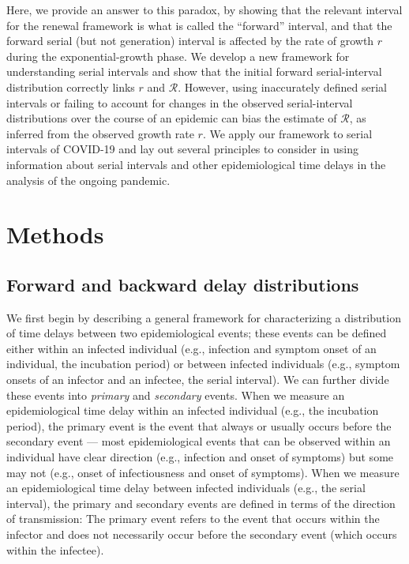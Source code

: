 \documentclass[12pt]{article}
\newcommand{\comment}{\showcomment}
\newcommand{\showcomment}[3]{\textcolor{#1}{\textbf{[#2: }\textsl{#3}\textbf{]}}}
\newcommand{\jd}[1]{\comment{cyan}{JD}{#1}}
\newcommand{\swp}[1]{\comment{magenta}{SWP}{#1}}
\newcommand{\RR}{\ensuremath{{\mathcal R}}\xspace}
\begin{document}
Here, we provide an answer to this paradox, by showing that the relevant interval for the renewal framework is what is called the ``forward'' interval, and that the forward serial (but not generation) interval is affected by the rate of growth $r$ during the exponential-growth phase.
We develop a new framework for understanding serial intervals and show that the initial forward serial-interval distribution correctly links $r$ and \RR.
However, using inaccurately defined serial intervals or failing to account for changes in the observed serial-interval distributions over the course of an epidemic can bias the estimate of \RR, as inferred from the observed growth rate $r$.
We apply our framework to serial intervals of COVID-19 and lay out several principles to consider in using information about serial intervals and other epidemiological time delays in the analysis of the ongoing pandemic.

\section{Methods}

\subsection{Forward and backward delay distributions}

We first begin by describing a general framework for characterizing a distribution of time delays between two epidemiological events;
these events can be defined either within an infected individual (e.g., infection and symptom onset of an individual, the incubation period) or between infected individuals (e.g., symptom onsets of an infector and an infectee, the serial interval).
We can further divide these events into \emph{primary} and \emph{secondary} events.
When we measure an epidemiological time delay within an infected individual (e.g., the incubation period), the primary event is the event that always or usually occurs before the secondary event ---
most epidemiological events that can be observed within an individual have clear direction (e.g., infection and onset of symptoms) but some may not (e.g., onset of infectiousness and onset of symptoms).
When we measure an epidemiological time delay between infected individuals (e.g., the serial interval), 
the primary and secondary events are defined in terms of the direction of transmission:
The primary event refers to the event that occurs within the infector
and does not necessarily occur before the secondary event (which
occurs within the infectee).
\end{document}
